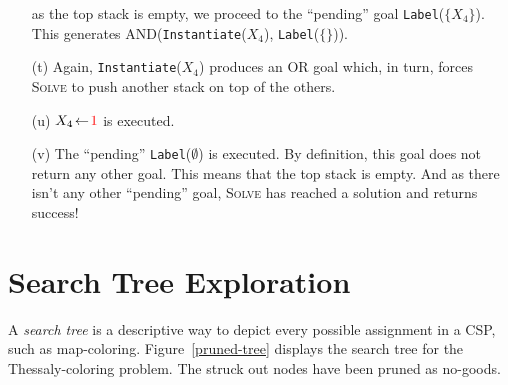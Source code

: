 \documentclass{ws-ijait}
\begin{document}
\begin{enumerate}
             as the top stack is empty, we proceed to the
             ``pending'' goal \texttt{Label}($\{X_4\}$).
             This generates
             \textsf{AND}(\texttt{Instantiate}($X_4$),
             \texttt{Label}($\{\}$)).
  \item[(t)] Again, \texttt{Instantiate}($X_4$) produces an
             \textsf{OR} goal which, in turn, forces
             \textsc{Solve} to push another stack on top of
             the others.
  \item[(u)] $X_4 \! \gets \! \textcolor{red}{1}$ is
             executed.
  \item[(v)] The ``pending'' \texttt{Label}($\emptyset$) is
             executed. By definition, this goal does not
             return any other goal. This means that the top
             stack is empty. And as there isn't any other
             ``pending'' goal, \textsc{Solve} has reached a
             solution and returns success!
\end{enumerate}


\section{Search Tree Exploration}

A \emph{search tree} is a descriptive way to depict every
possible assignment in a CSP, such as map-coloring.
Figure~\ref{pruned-tree} displays the search tree for the
Thessaly-coloring problem. The struck out nodes have been
pruned as no-goods.
\end{document}
